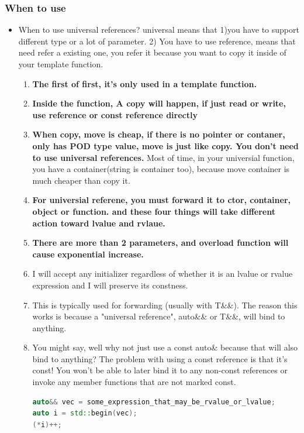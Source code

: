 \documentclass[a4paper,12pt,twoside]{book}
\begin{document}
\subsubsection{When to use }
\begin{itemize}
\item When to use universal references? universal means that 1)you have to support different type or a lot of parameter. 2) You have to use reference, means that need refer a existing one, you refer it because you want to copy it inside of your template function. 
		\begin{enumerate}
				\item \textbf{The first of first, it's only used in a template function.}
				
				\item \textbf{Inside the function, A copy will happen, if just read or write, use reference or const reference directly}
				
				\item \textbf{When copy, move is cheap, if there is no pointer or contaner, only has POD type value, move is just like copy. You don't need to use universal references.} Most of time, in your universial function, you have a container(string is container too), because move container is much cheaper than copy it.
				
				\item \textbf{For universial referene, you must forward it to ctor, container, object or function. and these four things will take different action toward lvalue and rvlaue.}
				
				\item \textbf{There are more than 2 parameters, and overload function will cause exponential increase.}

				\item I will accept any initializer regardless of whether it is an lvalue or rvalue expression and I will preserve its constness. 

				\item This is typically used for forwarding (usually with T\&\&). The reason this works is because a "universal reference", auto\&\& or T\&\&, will bind to anything.  

				\item You might say, well why not just use a const auto\& because that will also bind to anything? The problem with using a const reference is that it's const! You won't be able to later bind it to any non-const references or invoke any member functions that are not marked const.
\begin{lstlisting}[frame=single, language=c++]
auto&& vec = some_expression_that_may_be_rvalue_or_lvalue;
auto i = std::begin(vec);
(*i)++;


\end{lstlisting}
\end{enumerate}
\end{itemize}
\end{document}
